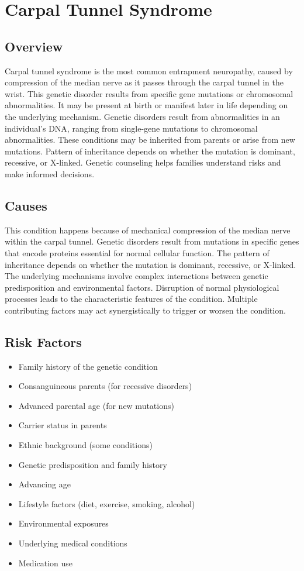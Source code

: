\chapter{Carpal Tunnel Syndrome}
\label{sec:Carpal Tunnel Syndrome}

\section{Overview}
Carpal tunnel syndrome is the most common entrapment neuropathy, caused by compression of the median nerve as it passes through the carpal tunnel in the wrist. This genetic disorder results from specific gene mutations or chromosomal abnormalities. It may be present at birth or manifest later in life depending on the underlying mechanism. Genetic disorders result from abnormalities in an individual's DNA, ranging from single-gene mutations to chromosomal abnormalities. These conditions may be inherited from parents or arise from new mutations. Pattern of inheritance depends on whether the mutation is dominant, recessive, or X-linked. Genetic counseling helps families understand risks and make informed decisions.
\section{Causes}
This condition happens because of mechanical compression of the median nerve within the carpal tunnel. Genetic disorders result from mutations in specific genes that encode proteins essential for normal cellular function. The pattern of inheritance depends on whether the mutation is dominant, recessive, or X-linked. The underlying mechanisms involve complex interactions between genetic predisposition and environmental factors. Disruption of normal physiological processes leads to the characteristic features of the condition. Multiple contributing factors may act synergistically to trigger or worsen the condition.
\section{Risk Factors}


\begin{itemize}[noitemsep]
  \item Family history of the genetic condition
  \item Consanguineous parents (for recessive disorders)
  \item Advanced parental age (for new mutations)
  \item Carrier status in parents
  \item Ethnic background (some conditions)
  \item Genetic predisposition and family history
  \item Advancing age
  \item Lifestyle factors (diet, exercise, smoking, alcohol)
  \item Environmental exposures
  \item Underlying medical conditions
  \item Medication use
\end{itemize}
